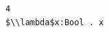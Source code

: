 \documentclass[border=10pt]{standalone}
\begin{document}
\begin{lstlisting}
4
$\\lambda$x:Bool . x
\end{lstlisting}
\end{document}
